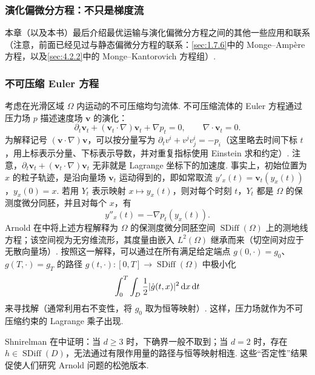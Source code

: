 \subsubsection{演化偏微分方程：不只是梯度流}\label{sec:8.4.4}
本章（以及本书）最后介绍最优运输与演化偏微分方程之间的其他一些应用和联系（注意，前面已经见过与静态偏微分方程的联系：\autoref{sec:1.7.6}中的 Monge--Amp\`ere 方程，以及\autoref{sec:4.2.2}中的 Monge--Kantorovich 方程组）.

\subsubsection*{不可压缩 Euler 方程}
\label{idx:i54-p314}
\label{idx:i78-p314}
考虑在光滑区域 $\Omega$ 内运动的不可压缩均匀流体. 不可压缩流体的 Euler 方程通过压力场 $p$ 描述速度场 $\mathbf v$ 的演化：
\[
\partial_t\mathbf v_t+(\mathbf v_t\cdot\nabla)\mathbf v_t+\nabla p_t=0,
\qquad\nabla\cdot\mathbf v_t=0.
\]
为解释记号 $(\mathbf v\cdot\nabla)\mathbf v$，可以按分量写为 $\partial_t v^i+v^jv_j^i=-p_i$（这里略去时间下标 $t$，用上标表示分量、下标表示导数，并对重复指标使用 Einstein 求和约定）. 注意，$\partial_t\mathbf v_t+(\mathbf v_t\cdot\nabla)\mathbf v_t$ 无非就是 Lagrange 坐标下的加速度. 事实上，初始位置为 $x$ 的粒子轨迹，是沿向量场 $\mathbf v_t$ 运动得到的，即如常取流 $y'_x(t)=\mathbf v_t(y_x(t))$，$y_x(0)=x$. 若用 $Y_t$ 表示映射 $x\mapsto y_x(t)$，则对每个时刻 $t$，$Y_t$ 都是 $\Omega$ 的保测度微分同胚，并且对每个 $x$，有
\[
y''_x(t)=-\nabla p_t(y_x(t)).
\]
\label{idx:i67-p314}
Arnold 在\cite{b22}中将上述方程解释为 $\Omega$ 的保测度微分同胚空间 $\operatorname{SDiff}(\Omega)$ 上的测地线方程；该空间视为无穷维流形，其度量由嵌入 $L^2(\Omega)$ 继承而来（切空间对应于无散向量场）. 按照这一解释，可以通过在所有满足给定端点 $g(0,\cdot)=g_0$、$g(T,\cdot)=g_T$ 的路径 $g(t,\cdot):[0,T]\to\operatorname{SDiff}(\Omega)$ 中极小化
\begin{equation}\label{eq:8.20}\index{K085@动能（kinetic energy）|hyperpage}
\int_0^T\int_D\frac12|\dot g(t,x)|^2\dd x\dd t
\end{equation}
来寻找解（通常利用右不变性，将 $g_0$ 取为恒等映射）. 这样，压力场就作为不可压缩约束的 Lagrange 乘子出现.

Shnirelman 在\cite{b284,b285}中证明：当 $d\geq3$ 时，下确界一般不取到；当 $d=2$ 时，存在 $h\in\operatorname{SDiff}(D)$，无法通过有限作用量的路径与恒等映射相连. 这些“否定性”结果促使人们研究 Arnold 问题的松弛版本.

